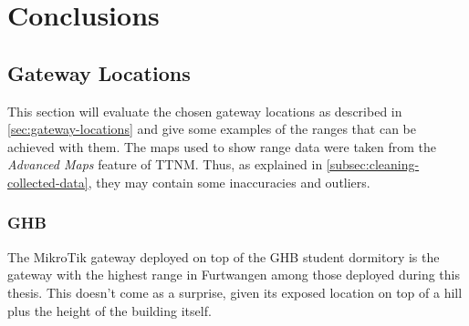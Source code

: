\chapter{Conclusions}

\section{Gateway Locations}\label{sec:gateway-locations-conclusions}

This section will evaluate the chosen gateway locations as described in \cref{sec:gateway-locations} and give some examples of the ranges that can be achieved with them.
The maps used to show range data were taken from the \emph{Advanced Maps} feature of \ac{TTNM}.
Thus, as explained in \cref{subsec:cleaning-collected-data}, they may contain some inaccuracies and outliers.

\subsection{\acl{GHB}}\label{subsec:ghb-student-dormitory-range-results}

The MikroTik gateway deployed on top of the \ac{GHB} student dormitory is the gateway with the highest range in Furtwangen among those deployed during this thesis.
This doesn't come as a surprise, given its exposed location on top of a hill plus the height of the building itself.

